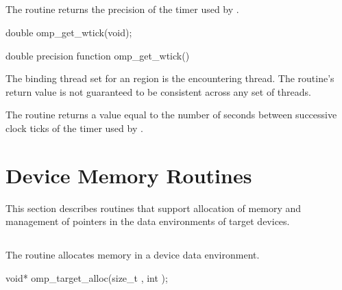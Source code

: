 \pagebreak
\subsection{}
\label{subsec:omp_get_wtick}
\summary
The  routine returns the precision of the timer used by 
.

\format
\ccppspecificstart
\begin{boxedcode}
double omp\_get\_wtick(void);
\end{boxedcode}
\ccppspecificend

\fortranspecificstart
\begin{boxedcode}
double precision function omp\_get\_wtick()
\end{boxedcode}
\fortranspecificend

\binding
The binding thread set for an  region is the encountering thread. The 
routine’s return value is not guaranteed to be consistent across any set of threads.

\effect
The  routine returns a value equal to the number of seconds between 
successive clock ticks of the timer used by .







\pagebreak
\ccppspecificstart
\vspace{-3\baselineskip}
\section{Device Memory Routines}
\label{sec:Device Memory Routines}
This section describes routines that support allocation of memory and 
management of pointers in the data environments of target devices.


\subsection{}
\label{subsec:omp_target_alloc}
\summary
The  routine allocates memory in a device data
environment.

\format
\begin{boxedcode}
void* omp\_target\_alloc(size\_t , int );
\end{boxedcode}

